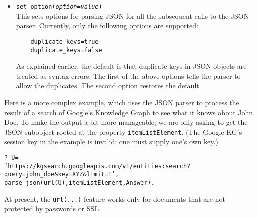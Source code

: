 \begin{itemize}
\item \texttt{set\_option(\emph{option}=\emph{value})}\\
  This sets options for parsing JSON for all the subsequent calls to the
  JSON parser. Currently, only the following options are supported:
\begin{verbatim}
    duplicate_keys=true
    duplicate_keys=false
\end{verbatim}
  As explained earlier, the default is that duplicate keys in JSON objects
  are treated as syntax errors. The first of the above options tells the
  parser to allow the duplicates. The second option restores the default.
\end{itemize}

Here is a more complex example, which uses the JSON parser to
process the result of a search of
Google's Knowledge Graph to see what it knows about John Doe.
To make the output a bit more manageable, we are only asking to get the
JSON subobject rooted at the property \texttt{itemListElement}.
(The Google KG's
session key in the example is invalid: one must supply one's own key.)
\begin{alltt}
?- U =
'\url{https://kgsearch.googleapis.com/v1/entities:search?query=john_doe&key=XYZ&limit=1}',
   parse\_json(url(U), itemListElement, Answer).
\end{alltt}
At present, the \texttt{url(...)} feature works only for documents
that are not protected by passwords or SSL. 





